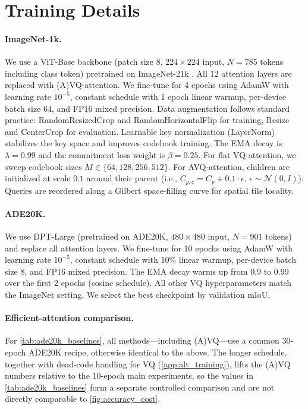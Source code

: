 \section{Training Details}
\label{app:training_details}

\paragraph{ImageNet-1k.} We use a ViT-Base backbone (patch size 8, $224{\times}224$ input, $N{=}785$ tokens including class token) pretrained on ImageNet-21k \cite{dosovitskiy2021vit}. All 12 attention layers are replaced with (A)VQ-attention. We fine-tune for 4 epochs using AdamW with learning rate $10^{-5}$, constant schedule with 1 epoch linear warmup, per-device batch size 64, and FP16 mixed precision. Data augmentation follows standard practice: RandomResizedCrop and RandomHorizontalFlip for training, Resize and CenterCrop for evaluation. Learnable key normalization (LayerNorm) stabilizes the key space and improves codebook training. The EMA decay is $\lambda = 0.99$ and the commitment loss weight is $\beta = 0.25$. For flat VQ-attention, we sweep codebook sizes $M \in \{64, 128, 256, 512\}$. For AVQ-attention, children are initialized at scale $0.1$ around their parent (i.e., $C_{p,c} = C_p + 0.1 \cdot \epsilon$, $\epsilon \sim \mathcal{N}(0, I)$). Queries are reordered along a Gilbert space-filling curve for spatial tile locality.

\paragraph{ADE20K.} We use DPT-Large \cite{ranftl2021dpt} (pretrained on ADE20K, $480{\times}480$ input, $N{=}901$ tokens) and replace all attention layers. We fine-tune for 10 epochs using AdamW with learning rate $10^{-5}$, constant schedule with 10\% linear warmup, per-device batch size 8, and FP16 mixed precision. The EMA decay warms up from $0.9$ to $0.99$ over the first 2 epochs (cosine schedule). All other VQ hyperparameters match the ImageNet setting. We select the best checkpoint by validation mIoU.

\paragraph{Efficient-attention comparison.} For \cref{tab:ade20k_baselines}, all methods---including (A)VQ---use a common 30-epoch ADE20K recipe, otherwise identical to the above. The longer schedule, together with dead-code handling for VQ (\cref{app:alt_training}), lifts the (A)VQ numbers relative to the 10-epoch main experiments, so the values in \cref{tab:ade20k_baselines} form a separate controlled comparison and are not directly comparable to \cref{fig:accuracy_cost}.

